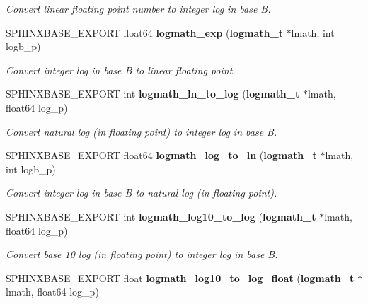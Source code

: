 \begin{DoxyCompactItemize}
\begin{DoxyCompactList}\small\item\em Convert linear floating point number to integer log in base B. \end{DoxyCompactList}\item 
S\+P\+H\+I\+N\+X\+B\+A\+S\+E\+\_\+\+E\+X\+P\+O\+R\+T float64 {\bf logmath\+\_\+exp} ({\bf logmath\+\_\+t} $\ast$lmath, int logb\+\_\+p)\label{logmath_8h_ae8b0a168e29e448c0d6de66dc46e099e}

\begin{DoxyCompactList}\small\item\em Convert integer log in base B to linear floating point. \end{DoxyCompactList}\item 
S\+P\+H\+I\+N\+X\+B\+A\+S\+E\+\_\+\+E\+X\+P\+O\+R\+T int {\bf logmath\+\_\+ln\+\_\+to\+\_\+log} ({\bf logmath\+\_\+t} $\ast$lmath, float64 log\+\_\+p)\label{logmath_8h_a52eff2c778ad758888b03ac5efcdccea}

\begin{DoxyCompactList}\small\item\em Convert natural log (in floating point) to integer log in base B. \end{DoxyCompactList}\item 
S\+P\+H\+I\+N\+X\+B\+A\+S\+E\+\_\+\+E\+X\+P\+O\+R\+T float64 {\bf logmath\+\_\+log\+\_\+to\+\_\+ln} ({\bf logmath\+\_\+t} $\ast$lmath, int logb\+\_\+p)\label{logmath_8h_a8035e176636eae8b4e02fe488f25457a}

\begin{DoxyCompactList}\small\item\em Convert integer log in base B to natural log (in floating point). \end{DoxyCompactList}\item 
S\+P\+H\+I\+N\+X\+B\+A\+S\+E\+\_\+\+E\+X\+P\+O\+R\+T int {\bf logmath\+\_\+log10\+\_\+to\+\_\+log} ({\bf logmath\+\_\+t} $\ast$lmath, float64 log\+\_\+p)\label{logmath_8h_aacb4dddeed63a61fb927915f7e3a642e}

\begin{DoxyCompactList}\small\item\em Convert base 10 log (in floating point) to integer log in base B. \end{DoxyCompactList}\item 
S\+P\+H\+I\+N\+X\+B\+A\+S\+E\+\_\+\+E\+X\+P\+O\+R\+T float {\bf logmath\+\_\+log10\+\_\+to\+\_\+log\+\_\+float} ({\bf logmath\+\_\+t} $\ast$lmath, float64 log\+\_\+p)\label{logmath_8h_a319ff7b55b6fca55e432ac8e85c368db}


\end{DoxyCompactItemize}
